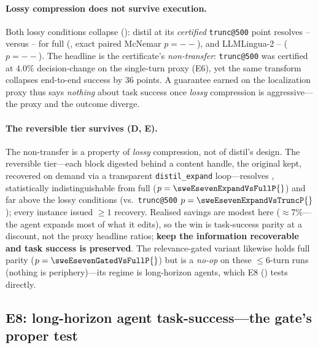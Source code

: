 \documentclass{article}
\newcommand{\sweEsevenFullPass}{--}\newcommand{\sweEsevenFullResolved}{--}%
\newcommand{\sweEsevenDistilPass}{--}\newcommand{\sweEsevenDistilResolved}{--}%
\newcommand{\sweEsevenLinguaPass}{--}\newcommand{\sweEsevenLinguaResolved}{--}%
\newcommand{\sweEsevenDistilVsFullP}{--}\newcommand{\sweEsevenLinguaVsFullP}{--}%
\begin{document}
\paragraph{Lossy compression does not survive execution.} Both lossy conditions collapse
(): distil at its \emph{certified} \texttt{trunc@500} point resolves
\sweEsevenDistilPass{} versus \sweEsevenFullPass{} for full (\sweEsevenDistilDelta{}, exact
paired McNemar $p=\sweEsevenDistilVsFullP{}$), and LLMLingua-2 \sweEsevenLinguaPass{}
($p=\sweEsevenLinguaVsFullP{}$). The headline is the certificate's \emph{non-transfer}:
\texttt{trunc@500} was certified at $4.0\%$ decision-change on the single-turn proxy (E6),
yet the same transform collapses end-to-end success by $36$ points. A guarantee earned on the
localization proxy thus says \emph{nothing} about task success once \emph{lossy} compression
is aggressive---the proxy and the outcome diverge.

\paragraph{The reversible tier survives (D, E).} The non-transfer is a property of
\emph{lossy} compression, not of distil's design. The reversible tier---each block digested
behind a content handle, the original kept, recovered on demand via a transparent
\texttt{distil\_expand} loop---resolves \textbf{\sweEsevenExpandPass}, statistically
indistinguishable from full ($p=\sweEsevenExpandVsFullP{}$) and far above the lossy
conditions (vs.\ \texttt{trunc@500} $p=\sweEsevenExpandVsTruncP{}$); every instance issued
$\ge1$ recovery. Realised savings are modest here ($\approx$7\%---the agent expands most of
what it edits), so the win is task-success parity at a discount, not the proxy headline
ratios; \textbf{keep the information recoverable and task success is preserved}. The
relevance-gated variant likewise holds full parity ($p=\sweEsevenGatedVsFullP{}$) but is a
\emph{no-op} on these $\le$6-turn runs (nothing is periphery)---its regime is long-horizon
agents, which E8 () tests directly.

\subsection{E8: long-horizon agent task-success---the gate's proper test}
\label{sec:e8}
\end{document}

